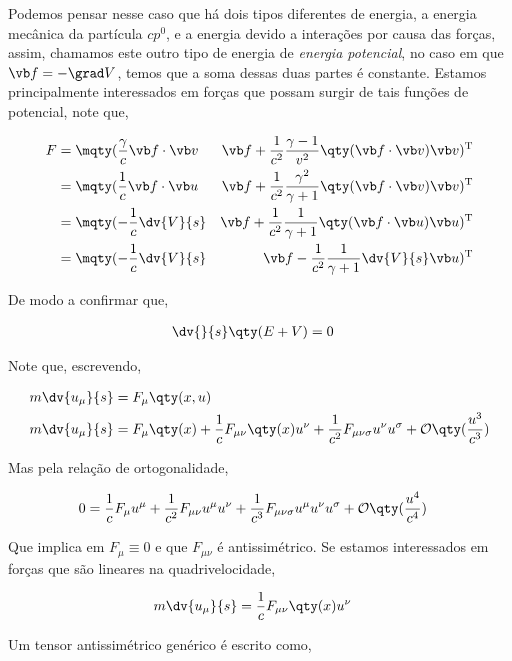 \documentclass[twoside]{amsart}
\numberwithin{equation}{section}
\begin{document}
\begin{refsection}
Podemos pensar nesse caso que há dois tipos diferentes de energia, a energia mecânica da partícula $cp^0$, e a energia devido a interações por causa das forças, assim, chamamos este outro tipo de energia de \emph{energia potencial}, no caso em que $\vb f=-\grad V$, temos que a soma dessas duas partes é constante. Estamos principalmente interessados em forças que possam surgir de tais funções de potencial, note que,

\begin{align}
    F&=\mqty(\frac\gamma c\vb f\cdot \vb v&\vb f+\frac{1}{c^2}\frac{\gamma -1}{v^2}\qty(\vb f\cdot \vb v)\vb v)^{\textup T}\\
    &=\mqty(\frac1c\vb f\cdot \vb u&\vb f+\frac{1}{c^2}\frac{\gamma^2}{\gamma+1}\qty(\vb f\cdot \vb v)\vb v)^{\textup T}\\
    &=\mqty(-\frac1c\dv{V}{s}&\vb f+\frac{1}{c^2}\frac{1}{\gamma+1}\qty(\vb f\cdot\vb u)\vb u)^{\textup T}\\
    &=\mqty(-\frac1c\dv{V}{s}&\vb f-\frac{1}{c^2}\frac{1}{\gamma+1}\dv{V}{s}\vb u)^{\textup T}
\end{align}

De modo a confirmar que,

\begin{align}
    \dv{}{s}\qty(E+V)&=0
\end{align}

Note que, escrevendo,

\begin{align}
    m\dv{u_\mu}{s}&=F_{\mu}\qty(x,u)\\
    m\dv{u_\mu}{s}&=F_{\mu}\qty(x)+\frac1cF_{\mu \nu}\qty(x)u^\nu+\frac{1}{c^2}F_{\mu\nu\sigma}u^\nu u^\sigma+\mathcal O\qty(\frac{u^3}{c^3})
\end{align}

Mas pela relação de ortogonalidade,

\begin{align}
    0&=\frac1cF_{\mu}u^\mu+\frac{1}{c^2}F_{\mu\nu}u^\mu u^\nu+\frac{1}{c^3}F_{\mu\nu\sigma}u^\mu u^\nu u^\sigma+\mathcal O\qty(\frac{u^4}{c^4})
\end{align}

Que implica em $F_\mu\equiv0$ e que $F_{\mu\nu}$ é antissimétrico. Se estamos interessados em forças que são lineares na quadrivelocidade,

\begin{align}
    m\dv{u_\mu}{s}&=\frac1cF_{\mu\nu}\qty(x)u^\nu
\end{align}

Um tensor antissimétrico genérico é escrito como,


\end{refsection}
\end{document}
